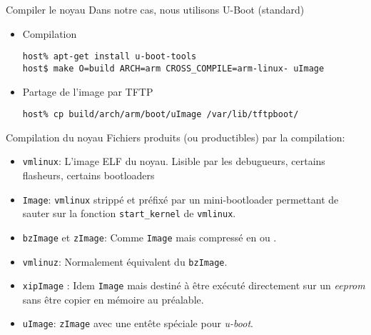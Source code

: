 \begin{frame}[fragile=singleslide]{Compiler le noyau}
  Dans notre cas, nous utilisons U-Boot (standard)
  \begin{itemize}
  \item Compilation
    \begin{lstlisting}
host% apt-get install u-boot-tools
host$ make O=build ARCH=arm CROSS_COMPILE=arm-linux- uImage
    \end{lstlisting}
  \item Partage de l'image par TFTP
    \begin{lstlisting}
host% cp build/arch/arm/boot/uImage /var/lib/tftpboot/
    \end{lstlisting} %
  \end{itemize}
\end{frame}

\begin{frame}[fragile=singleslide]{Compilation du noyau}
  Fichiers produits (ou productibles) par la compilation:
  \begin{itemize}
  \item  \verb+vmlinux+:  L'image  ELF  du  noyau.   Lisible  par  les
    debugueurs, certains flasheurs, certains bootloaders
  \item  \verb+Image+:  \verb+vmlinux+   strippé  et  préfixé  par  un
    mini-bootloader   permettant    de   sauter   sur    la   fonction
    \verb+start_kernel+ de \verb+vmlinux+.
  \item  \verb+bzImage+  et   \verb+zImage+: Comme \verb+Image+ mais compressé en  ou .
  \item  \verb+vmlinuz+: Normalement  équivalent  du \verb+bzImage+.
  \item  \verb+xipImage+  :  Idem  \verb+Image+ mais  destiné  à  être
    exécuté  directement  sur un  \emph{eeprom}  sans  être copier  en
    mémoire au préalable.
  \item  \verb+uImage+:  \verb+zImage+ avec  une  entête spéciale  pour
    \emph{u-boot}.
  \end{itemize}
\end{frame}

